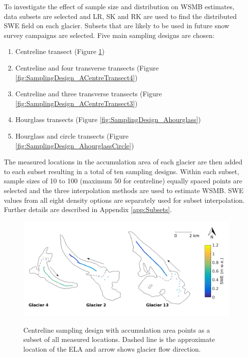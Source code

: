 \documentclass[12pt]{article}
\begin{document}
To investigate the effect of sample size and distribution on WSMB estimates, data subsets are selected and LR, SK and RK are used to find the distributed SWE field on each glacier. Subsets that are likely to be used in future snow survey campaigns are selected. Five main sampling designs are chosen:
\begin{enumerate}
\item Centreline transect (Figure \ref{fig:SamplingDesign_Acentreline})
\item Centreline and four transverse transects (Figure \ref{fig:SamplingDesign_ACentreTransect4})
\item Centreline and three transverse transects (Figure \ref{fig:SamplingDesign_ACentreTransect3})
\item Hourglass transects (Figure \ref{fig:SamplingDesign_Ahourglass})
\item Hourglass and circle transects (Figure \ref{fig:SamplingDesign_AhourglassCircle})
\end{enumerate}
The measured locations in the accumulation area of each glacier are then added to each subset resulting in a total of ten sampling designs. Within each subset, sample sizes of 10 to 100 (maximum 50 for centreline) equally spaced points are selected and the three interpolation methods are used to estimate WSMB. SWE values from all eight density options are separately used for subset interpolation. Further details are described in Appendix \ref{app:Subsets}. 

\begin{figure}[H]
	\centering
	\includegraphics[width =\textwidth]{SamplingDesign_Acentreline.png}\\
	\caption{Centreline sampling design with accumulation area points as a subset of all measured locations. Dashed line is the approximate location of the ELA and arrow shows glacier flow direction.}
	\label{fig:SamplingDesign_Acentreline}
\end{figure}
\end{document}
